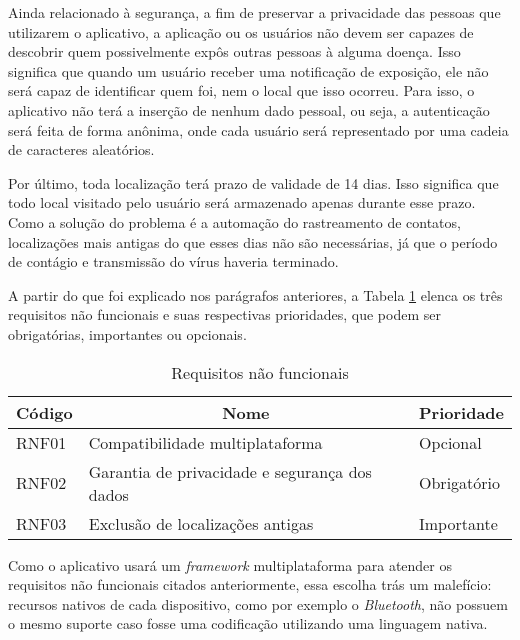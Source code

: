 Ainda relacionado à segurança, a fim de preservar a privacidade das pessoas que utilizarem o aplicativo, a aplicação ou os usuários não devem ser capazes de descobrir quem possivelmente expôs outras pessoas à alguma doença. Isso significa que quando um usuário receber uma notificação de exposição, ele não será capaz de identificar quem foi, nem o local que isso ocorreu. Para isso, o aplicativo não terá a inserção de nenhum dado pessoal, ou seja, a autenticação será feita de forma anônima, onde cada usuário será representado por uma cadeia de caracteres aleatórios.

Por último, toda localização terá prazo de validade de 14 dias. Isso significa que todo local visitado pelo usuário será armazenado apenas durante esse prazo. Como a solução do problema é a automação do rastreamento de contatos, localizações mais antigas do que esses dias não são necessárias, já que o período de contágio e transmissão do vírus haveria terminado.

A partir do que foi explicado nos parágrafos anteriores, a Tabela \ref{tab:tabelanf} elenca os três requisitos não funcionais e suas respectivas prioridades, que podem ser obrigatórias, importantes ou opcionais.

\begin{table}[!htb]
\caption[Tabela de requisitos não funcionais]{Requisitos não funcionais}
\label{tab:tabelanf}
\begin{center}
\begin{tabular}{|l|l|l|}
\hline
\multicolumn{1}{|c|}{\textbf{Código}} & \multicolumn{1}{c|}{\textbf{Nome}}            & \multicolumn{1}{c|}{\textbf{Prioridade}} \\ \hline
RNF01                                 & Compatibilidade multiplataforma               & Opcional                                 \\ \hline
RNF02                                 & Garantia de privacidade e segurança dos dados & Obrigatório                              \\ \hline
RNF03                                 & Exclusão de localizações antigas              & Importante                               \\ \hline
\end{tabular}
\end{center}
\end{table}

Como o aplicativo usará um \textit{framework} multiplataforma para atender os requisitos não funcionais citados anteriormente, essa escolha trás um malefício: recursos nativos de cada dispositivo, como por exemplo o \textit{Bluetooth}, não possuem o mesmo suporte caso fosse uma codificação utilizando uma linguagem nativa.

